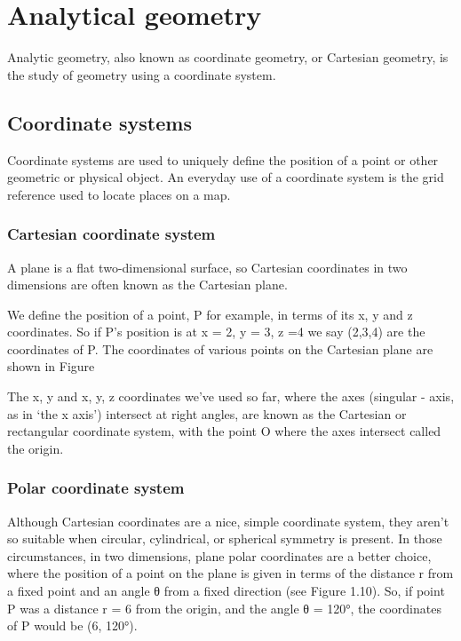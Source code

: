 \chapter{Analytical geometry}

Analytic geometry, also known as coordinate geometry, or Cartesian geometry, is the study of geometry using a coordinate system.

\section{Coordinate systems}
Coordinate systems are used to uniquely define the position of a point or other geometric or physical object. An everyday use of a coordinate system is the grid reference used to locate places on a map.


\subsection{Cartesian coordinate system}
A plane is a flat two-dimensional surface, so Cartesian coordinates in two dimensions are often known as the Cartesian plane.

We define the position of a point, P for example, in terms of its x, y and z coordinates. So if P's position is at x = 2, y = 3, z =4 we say (2,3,4) are the coordinates of P. The coordinates of various points on the Cartesian plane are shown in Figure


The x, y and x, y, z coordinates we've used so far, where the axes (singular - axis, as in ‘the x axis’) intersect at right angles, are known as the Cartesian or rectangular coordinate system, with the point O where the axes intersect called the origin.


\subsection{Polar coordinate system}
Although Cartesian coordinates are a nice, simple coordinate system, they aren't so suitable when circular, cylindrical, or spherical symmetry is present. In those circumstances, in two dimensions, plane polar coordinates are a better choice, where the position of a point on the plane is given in terms of the distance r from a fixed point and an angle θ from a fixed direction (see Figure 1.10). So, if point P was a distance r = 6 from the origin, and the angle θ = 120°, the coordinates of P would be (6, 120°).

